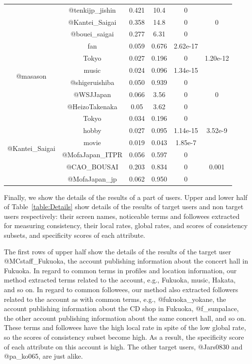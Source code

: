 \begin{table}[p]
\begin{center}
{\begin{tabular}{cccccc}
 & @tenkijp\_jishin & 0.421 & 10.4 & 0  & \\
 & @Kantei\_Saigai & 0.358 & 14.8 & 0 & 0 \\
 & @bouei\_saigai & 0.277 & 6.31 & 0 & \\ \midrule
 \multirow{6}{*}{@masason} & fan & 0.059 & 0.676 & 2.62e-17 \\
 & Tokyo & 0.027 & 0.196 & 0 & 1.20e-12 \\
 & music & 0.024 & 0.096 & 1.34e-15 & \\ \cmidrule(lr){2-6}
 & @shigeruishiba & 0.050 & 0.939 & 0 & \\
 & @WSJJapan & 0.066 & 3.56 & 0 & 0 \\
 & @HeizoTakenaka & 0.05 & 3.62 & 0 & \\ \midrule
 \multirow{6}{*}{@Kantei\_Saigai} & Tokyo & 0.034 & 0.196 & 0 & \\
 & hobby & 0.027 & 0.095 & 1.14e-15 & 3.52e-9 \\
 & movie & 0.019 & 0.043 & 1.85e-7 & \\ \cmidrule(lr){2-6}
 & @MofaJapan\_ITPR & 0.056 & 0.597 & 0 & \\
 & @CAO\_BOUSAI & 0.203 & 0.834 & 0 & 0.001 \\
 & @MofaJapan\_jp & 0.062 & 0.950 & 0 & \\ \bottomrule
\end{tabular}
}
\end{center}
\end{table}

Finally, we show the details of the results of a part of users.  Upper
and lower half of Table~\ref{table:Details} show details of the results
of target users and non target users respectively: their screen
names, noticeable terms and followees extracted for measuring
consistency, their local rates, global rates, and scores of consistency
subsets, and specificity scores of each attribute.

The first rows of upper half show the details of the results of the
target user @MCstaff\_Fukuoka, the account publishing information about
the concert hall in Fukuoka.  In regard to common terms in profiles and
location information, our method extracted terms related to the account,
e.g., Fukuoka, music, Hakata, and so on.  In regard to common followees,
our method also extracted followers related to the account as with
common terms, e.g., @fukuoka\_yokane, the account publishing information
about the CD shop in Fukuoka, @f\_sunpalace, the other account
publishing information about the same concert hall, and so on.  These
terms and followees have the high local rate in spite of the low global
rate, so the scores of consistency subset become high.  As a result, the
specificity score of each attribute on this account is high.  The other
target users, @Jars0830 and @pa\_ko065, are just alike.

